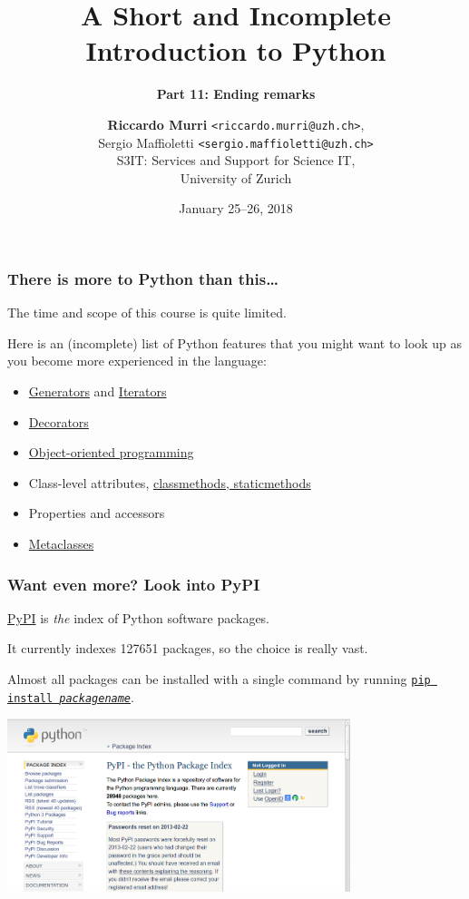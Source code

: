 \documentclass[english,serif,mathserif,xcolor=pdftex,dvipsnames,table]{beamer}
\title[Introduction to Python]{%
  A Short and Incomplete Introduction to Python
}
\subtitle{\bfseries Part 11: Ending remarks}
\author[R.~Murri]{%
  \textbf{Riccardo Murri} \texttt{<riccardo.murri@uzh.ch>}, \\
  Sergio Maffioletti \texttt{<sergio.maffioletti@uzh.ch>}
  \\
  S3IT: Services and Support for Science IT,
  \\
  University of Zurich
}
\date{January 25--26, 2018}
\begin{document}
\maketitle



\begin{frame}
  \frametitle{There is more to Python than this\ldots}

  The time and scope of this course is quite limited.

  \+
  Here is an (incomplete) list of Python features that you might
  want to look up as you become more experienced in the language:
  \begin{itemize}
  \item
    \href{http://docs.python.org/2/tutorial/classes.html\#generators}{Generators}
    and
    \href{http://docs.python.org/2/tutorial/classes.html\#iterators}{Iterators}
  \item
    \href{http://www.artima.com/weblogs/viewpost.jsp?thread=240808}{Decorators}
  \item \href{https://github.com/gc3-uzh-ch/python-course}{Object-oriented programming}
  \item Class-level attributes, \href{http://stackoverflow.com/a/12179752/1808780}{classmethods, staticmethods}
  \item Properties and accessors
  \item \href{http://stackoverflow.com/a/6581949/459543}{Metaclasses}
  \end{itemize}
\end{frame}


\begin{frame}
  \frametitle{Want even more? Look into PyPI}

  \href{http://pypi.python.org}{PyPI} is \emph{the} index of Python software packages.

  \+ It currently indexes 127651 packages, so the choice is really vast.

  \+ Almost all packages can be installed with a single command by
  running \href{https://pypi.python.org/pypi/pip}{\texttt{pip install
    \emph{packagename}}}.

  \+
  \begin{center}
    \includegraphics[width=0.75\textwidth]{fig/pypi_screenshot.png}
  \end{center}
\end{frame}
\end{document}
